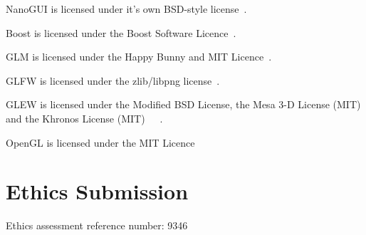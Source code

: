 \documentclass[a4paper,10pt]{report}
\begin{document}
NanoGUI is licensed under it's own BSD-style license~\cite{nanoGUILicence}.\medskip

Boost is licensed under the Boost Software Licence~\cite{boostSoftwareLicence}.\medskip

GLM is licensed under the Happy Bunny and MIT Licence~\cite{bunny}.\medskip

GLFW is licensed under the zlib/libpng license~\cite{zlib}.\medskip

GLEW is licensed under the Modified BSD License, the Mesa 3-D License (MIT) and the Khronos License (MIT)~\cite{GLEWlib}~\cite{mesa3D}~\cite{khronoslicence}. \medskip

OpenGL is licensed under the MIT Licence~\cite{mitlicence}


\chapter{Ethics Submission}

Ethics assessment reference number: 9346
\begin{figure}[h!]
    \centering

\end{figure}
\end{document}
